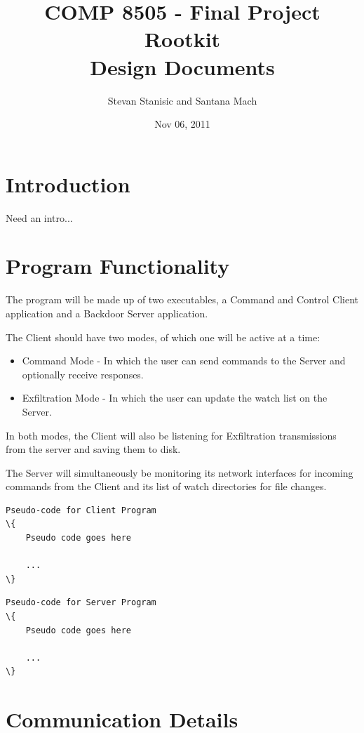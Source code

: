 \documentclass[titlepage]{article}
\begin{document}
\author{Stevan Stanisic and Santana Mach}
\title{COMP 8505 - Final Project \\ Rootkit \\ Design Documents}
\date{Nov 06, 2011}
\maketitle{}

\tableofcontents
\pagebreak

\section{Introduction}

Need an intro...

\section{Program Functionality}

The program will be made up of two executables, a Command and Control Client application and a Backdoor Server application.

The Client should have two modes, of which one will be active at a time:
\begin{itemize}
  \item Command Mode - In which the user can send commands to the Server and optionally receive responses.
  \item Exfiltration Mode - In which the user can update the watch list on the Server.
\end{itemize}

In both modes, the Client will also be listening for Exfiltration transmissions from the server and saving them to disk.

The Server will simultaneously be monitoring its network interfaces for incoming commands from the Client and its list of
watch directories for file changes.

\begin{lstlisting}
Pseudo-code for Client Program
\{
	Pseudo code goes here

	...
\}
\end{lstlisting}

\begin{lstlisting}
Pseudo-code for Server Program
\{
	Pseudo code goes here

	...
\}
\end{lstlisting}

\section{Communication Details}
\end{document}
